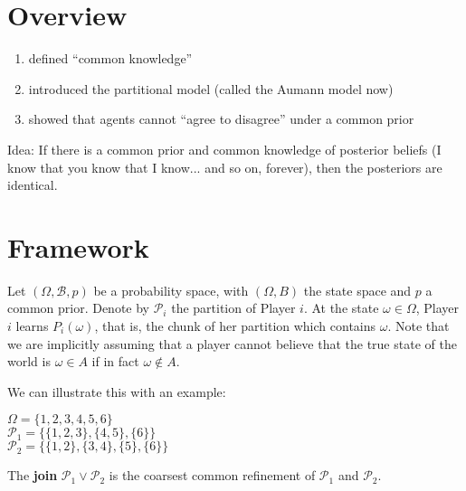 
 {}




\section*{Overview}
\begin{enumerate}
	\item defined ``common knowledge''
	\item introduced the partitional model (called the Aumann model now)
	\item showed that agents cannot ``agree to disagree'' under a common prior
\end{enumerate}

Idea: If there is a common prior and common knowledge of posterior beliefs (I know that you know that I know... and so on, forever), then the posteriors are identical.

\section*{Framework}

Let $(\Omega, \mathcal{B},p)$ be a probability space, with $(\Omega, B)$ the state space and $p$ a common prior.  Denote by $\mathcal{P}_i$ the partition of Player $i$.  At the state $\omega\in\Omega$, Player $i$ learns $P_i(\omega)$, that is, the chunk of her partition which contains $\omega$.  Note that we are implicitly assuming that a player cannot believe that the true state of the world is $\omega\in A$ if in fact $\omega\notin A$.


We can illustrate this with an example:

 $\Omega=\{1,2,3,4,5,6\}$\\$\mathcal{P}_1=\{\{1,2,3\},\{4,5\},\{6\}\}$\\$\mathcal{P}_2=\{\{1,2\},\{3,4\},\{5\},\{6\}\}$
 
 The \textbf{join} $\mathcal{P}_1\lor\mathcal{P}_2$ is the coarsest common refinement of $\mathcal{P}_1$ and $\mathcal{P}_2$.
 
